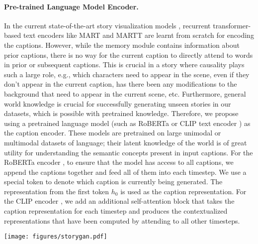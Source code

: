 \documentclass[runningheads]{llncs}
\newcommand{\sgan}[1]{\textsc{StoryGANc}}
\begin{document}
\paragraph{Pre-trained Language Model Encoder.}
In the current state-of-the-art story visualization models \cite{maharana2021improving}, recurrent transformer-based text encoders like MART \cite{lei2020mart} and MARTT \cite{maharana2021integrating} are learnt from scratch for encoding the captions. However, while the memory module contains information about prior captions, there is no way for the current caption to directly attend to words in prior or subsequent captions. This is crucial in a story where causality plays such a large role, e.g., which characters need to appear in the scene, even if they don't appear in the current caption, has there been any modifications to the background that need to appear in the current scene, etc. Furthermore, general world knowledge is crucial for successfully generating unseen stories in our datasets, which is possible with pretrained knowledge. Therefore, we propose using a pretrained language model (such as RoBERTa \cite{liu2019roberta} or CLIP text encoder \cite{radford2021learning}) as the caption encoder. These models are pretrained on large unimodal or multimodal datasets of language; their latent knowledge of the world is of great utility for understanding the semantic concepts present in input captions. For the RoBERTa encoder \cite{liu2019roberta}, to ensure that the model has access to all captions, we append the captions together and feed all of them into each timestep. We use a special token to denote which caption is currently being generated. The representation from the first token $h_{0}$ is used as the caption representation. For the CLIP encoder \cite{radford2021learning}, we add an additional self-attention block that takes the caption representation for each timestep and produces the contextualized representations that have been computed by attending to all other timesteps.

\begin{figure*}[t]
    \centering
    \texttt{[image: figures/storygan.pdf]}
    \caption{Illustration of our \sgan{} architecture. The captions are first encoded using a pretrained language model to produce contextualized representations. These representations are sent to a contextual attention module along with the source frame, and the resulting representation is sent to the image generator. The generated frames are sent to a story and image discriminator, and the corresponding cross-entropy losses for detection real/fake images are used to train the \sgan{} model.}
    \label{fig:model_storygan}
\end{figure*}
\end{document}
